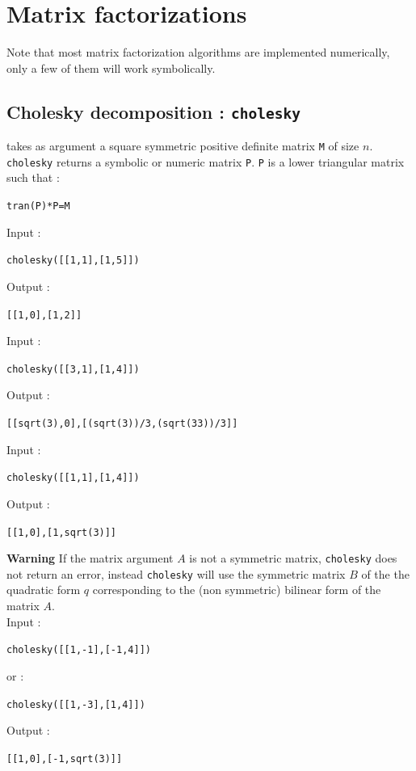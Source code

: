 \documentclass[a4paper,11pt]{book}
\begin{document}
\section{Matrix factorizations}\label{sec:factormatrice}
Note that most matrix factorization algorithms are implemented numerically,
only a few of them will work symbolically.

\subsection{Cholesky decomposition : {\tt cholesky}}
 takes as argument a square symmetric
positive definite matrix {\tt M} of size $n$.\\
{\tt cholesky} returns a symbolic or numeric matrix {\tt P}. {\tt P} is a
lower triangular matrix  such that :
\begin{center}
{\tt tran(P)*P=M}
\end{center}
Input :
\begin{center}{\tt cholesky([[1,1],[1,5]])}\end{center}
Output :
\begin{center}{\tt [[1,0],[1,2]]}\end{center}
Input :
\begin{center}{\tt cholesky([[3,1],[1,4]])}\end{center}
Output :
\begin{center}{\tt [[sqrt(3),0],[(sqrt(3))/3,(sqrt(33))/3]]}\end{center}
Input :
\begin{center}{\tt cholesky([[1,1],[1,4]])}\end{center}
Output :
\begin{center}{\tt [[1,0],[1,sqrt(3)]]}\end{center}
{\bf Warning} If the matrix argument $A$ is not a symmetric matrix,
{\tt cholesky} does not return an error, instead {\tt cholesky} will
use the symmetric matrix $B$ of the the quadratic form $q$ 
corresponding to the (non symmetric) bilinear form of the matrix $A$.\\
Input :
\begin{center}{\tt cholesky([[1,-1],[-1,4]])}\end{center}
or :
\begin{center}{\tt cholesky([[1,-3],[1,4]])}\end{center}
Output :
\begin{center}{\tt [[1,0],[-1,sqrt(3)]]}\end{center}
\end{document}
